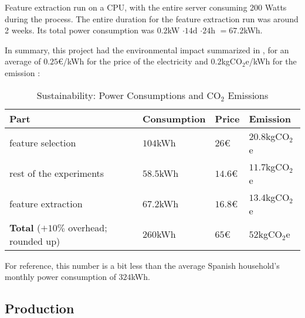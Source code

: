 Feature extraction run on a CPU, with the entire server consuming 200 Watts during the process. The entire duration for the feature extraction run was around 2 weeks. Its total power consumption was $0.2$kW $ \cdot 14$d $ \cdot 24$h $ = 67.2$kWh.\par
In summary, this project had the environmental impact summarized in , for an average of $0.25$€/kWh for the price of the electricity \cite{kwhprice} and $0.2$kgCO$_{2}$e/kWh for the emission \cite{carbon}:
\begin{table}[H]
\centering
\begin{tabular}{|l|l|l|l|}
\hline
\textbf{Part} & \textbf{Consumption} & \textbf{Price} & \textbf{Emission} \\ \hline
feature selection & $104$kWh & $26$€ & $20.8$kgCO$_{2}$e \\ \hline
rest of the experiments & $58.5$kWh & $14.6$€ & $11.7$kgCO$_{2}$e \\ \hline
feature extraction & $67.2$kWh & $16.8$€ & $13.4$kgCO$_{2}$e \\ \hline
\textbf{Total} ($+10\%$ overhead; rounded up) & $260$kWh & $65$€ & $52$kgCO$_{2}$e \\ \hline
\end{tabular}
\caption{Sustainability: Power Consumptions and CO$_{2}$ Emissions}
\label{tab:sus1}
\end{table}
For reference, this number is a bit less than the average Spanish household's monthly power consumption of $324$kWh. \cite{kwhavg}

\subsection{Production}
\label{sec:susprod}

